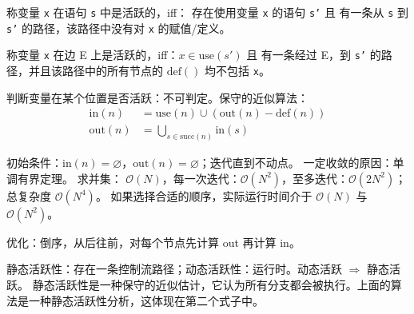 \par \noindent 称变量 \texttt{x} 在语句 \texttt{s} 中是活跃的，iff：
存在使用变量 \texttt{x} 的语句 \texttt{s'} 且
有一条从 \texttt{s} 到 \texttt{s'} 的路径，该路径中没有对 \texttt{x} 的赋值/定义。
\par \noindent 称变量 \texttt{x} 在边 E 上是活跃的，iff：$x \in \text{use}(s')$ 且
有一条经过 E，到 \texttt{s'} 的路径，并且该路径中的所有节点的 $\text{def}()$ 均不包括 \texttt{x}。

\par \noindent 判断变量在某个位置是否活跃：不可判定。保守的近似算法：
\vspace{-10pt}
$$
\begin{array}{rl}
    \text{in}(n)  &= \text{use}(n) \cup (\text{out}(n) - \text{def}(n)) \\
    \text{out}(n) &= \bigcup_{s \in \text{succ}(n)} \text{in}(s)
\end{array}
$$
\vspace{-15pt}
\par \noindent 初始条件：$\text{in}(n) = \varnothing$，$\text{out}(n) = \varnothing$；迭代直到不动点。
一定收敛的原因：单调有界定理。
求并集： $\mathcal{O}(N)$，每一次迭代：$\mathcal{O}(N^2)$，至多迭代：$\mathcal{O}(2N^2)$；总复杂度 $\mathcal{O}(N^4)$。
如果选择合适的顺序，实际运行时间介于 $\mathcal{O}(N)$ 与 $\mathcal{O}(N^2)$。

\par \noindent 优化：倒序，从后往前，对每个节点先计算 out 再计算 in。

\par \noindent 静态活跃性：存在一条控制流路径；动态活跃性：运行时。动态活跃 $\Rightarrow$ 静态活跃。
静态活跃性是一种保守的近似估计，它认为所有分支都会被执行。上面的算法是一种静态活跃性分析，这体现在第二个式子中。
